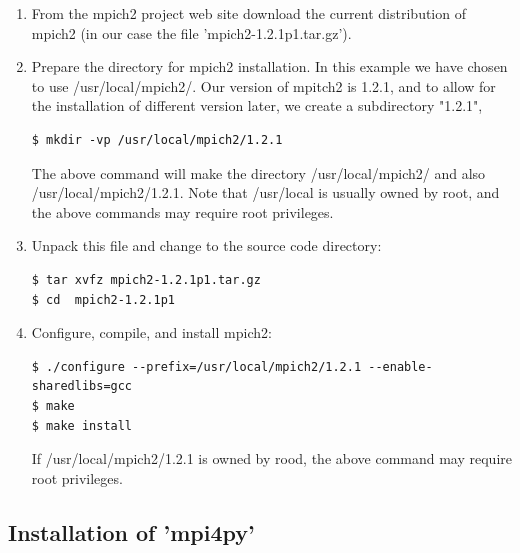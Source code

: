 \begin{enumerate}

\item From the mpich2 project web site download the current distribution of
mpich2 (in our case the file 'mpich2-1.2.1p1.tar.gz').

\item Prepare the directory for mpich2 installation. In this example
we have chosen to use /usr/local/mpich2/. Our version of mpitch2 is
1.2.1, and to allow for the installation of different version later,
we create a subdirectory "1.2.1",

\begin{verbatim}
$ mkdir -vp /usr/local/mpich2/1.2.1
\end{verbatim}

The above command will make the directory /usr/local/mpich2/ and also
/usr/local/mpich2/1.2.1. Note that /usr/local is usually owned by
root, and the above commands may require root privileges.

\item Unpack this file and change to the source code directory:

\begin{verbatim}
$ tar xvfz mpich2-1.2.1p1.tar.gz 
$ cd  mpich2-1.2.1p1
\end{verbatim}

\item Configure, compile, and install mpich2:

\begin{verbatim}
$ ./configure --prefix=/usr/local/mpich2/1.2.1 --enable-sharedlibs=gcc
$ make
$ make install
\end{verbatim}

If /usr/local/mpich2/1.2.1 is owned by rood, the above command
may require root privileges.

\end{enumerate}

\subsection{\label{sec:mpi4py}Installation of 'mpi4py'}

